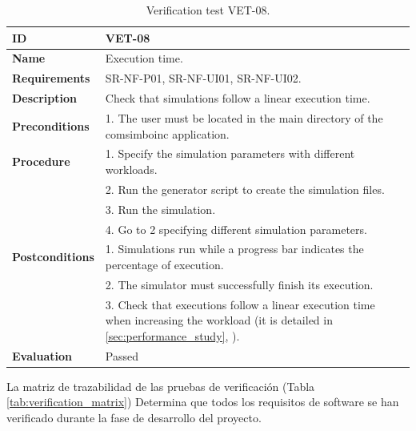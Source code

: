 \begin{center}
\begin{table}[htb]
\centering
\begin{tabular}{@{}p{2.5cm} p{13cm}@{}} 
\toprule
\textbf{ID} 					& VET-08 \\
\midrule
\textbf{Name} 				& Execution time. \\
\midrule
\textbf{Requirements} 		& SR-NF-P01, SR-NF-UI01, SR-NF-UI02. \\
\midrule
\textbf{Description} 		& Check that simulations follow a linear execution time. \\
\midrule
\textbf{Preconditions}		& 1. The user must be located in the main directory of the \gls{comsimboinc} application. \\
\midrule
\textbf{Procedure}			& 1. Specify the simulation parameters with different workloads. \\
							& 2. Run the generator script to create the simulation files.\\
							& 3. Run the simulation.\\
							
							& 4. Go to 2 specifying different simulation parameters.\\
\midrule
\textbf{Postconditions} 		& 1. Simulations run while a progress bar indicates the percentage of execution. \\
							& 2. The simulator must successfully finish its execution. \\
							& 3. Check that executions follow a linear execution time when increasing the workload (it is detailed in \ref{sec:performance_study}, \textit{\nameref{sec:performance_study}}). \\
\midrule
\textbf{Evaluation} 			& Passed \\
\bottomrule
\end{tabular}
\caption{Verification test VET-08.}
\label{tab:vet08}
\end{table}
\end{center}


\clearpage



La matriz de trazabilidad de las pruebas de verificación (Tabla \ref{tab:verification_matrix}) Determina que todos los requisitos de software se han verificado durante la fase de desarrollo del proyecto.

\vspace{2cm}


